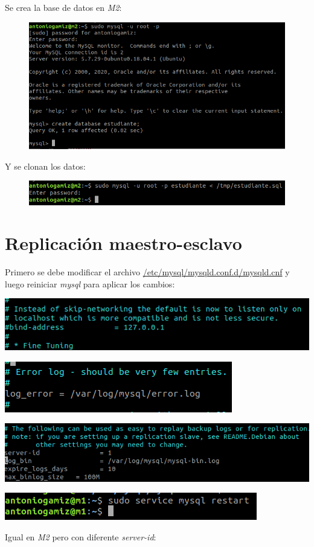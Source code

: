 \documentclass[12pt]{article}
\begin{document}
Se crea la base de datos en \textit{M2}:
\begin{figure}[H]
\center
\includegraphics[scale=0.35]{8.png}
\end{figure}
Y se clonan los datos:
\begin{figure}[H]
\center
\includegraphics[scale=0.35]{9.png}
\end{figure}

\section{Replicación maestro-esclavo}

Primero se debe modificar el archivo \url{/etc/mysql/mysqld.conf.d/mysqld.cnf} y luego reiniciar \textit{mysql} para aplicar los cambios:
\begin{center}
\includegraphics[scale=0.4]{10.png}

\includegraphics[scale=0.4]{11.png}

\includegraphics[scale=0.4]{12.png}

\includegraphics[scale=0.4]{13.png}
\end{center}
Igual en \textit{M2} pero con diferente \textit{server-id}:
\end{document}
